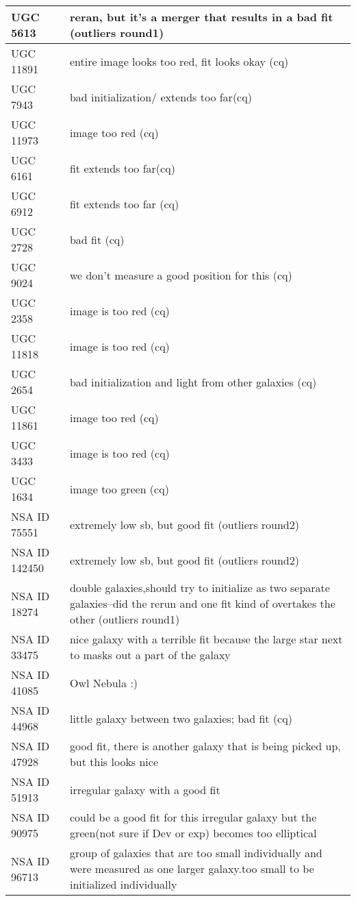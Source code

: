 \documentclass[10pt]{article}
\begin{document}
\begin{landscape}
\begin{longtable}{|l|l|}
UGC 5613 & reran, but it's a merger that results in a bad fit (outliers round1)\\ \hline
UGC 11891 & entire image looks too red, fit looks okay (cq)\\ \hline
UGC 7943 & bad initialization/ extends too far(cq)\\ \hline
UGC 11973 & image too red (cq)\\ \hline
UGC 6161 & fit extends too far(cq)\\ \hline
UGC 6912 & fit extends too far (cq)\\ \hline
UGC 2728 & bad fit (cq)\\ \hline
UGC 9024 & we don't measure a good position for this (cq)\\ \hline
UGC 2358 & image is too red (cq)\\ \hline
UGC 11818 & image is too red (cq)\\ \hline
UGC 2654 & bad initialization and light from other galaxies (cq)\\ \hline
UGC 11861 & image too red (cq)\\ \hline
UGC 3433 & image is too red (cq)\\ \hline
UGC 1634 & image too green (cq)\\ \hline
NSA ID 75551 & extremely low sb, but good fit (outliers round2)\\ \hline
NSA ID 142450 & extremely low sb, but good fit (outliers round2)\\ \hline
NSA ID 18274 & double galaxies,should try to initialize as two separate galaxies--did the rerun and one fit kind of overtakes the other (outliers round1)\\ \hline
NSA ID 33475 & nice galaxy with a terrible fit because the large star next to masks out a part of the galaxy\\ \hline
NSA ID 41085 & Owl Nebula :)\\ \hline
NSA ID 44968 & little galaxy between two galaxies; bad fit (cq)\\ \hline
NSA ID 47928 & good fit, there is another galaxy that is being picked up, but this looks nice\\ \hline
NSA ID 51913 & irregular galaxy with a good fit\\ \hline
NSA ID 90975 & could be a good fit for this irregular galaxy but the green(not sure if Dev or exp) becomes too elliptical\\ \hline
NSA ID 96713 & group of galaxies that are too small individually and were measured as one larger galaxy.too small to be initialized individually\\ \hline

\end{longtable}
\end{landscape}
\end{document}
